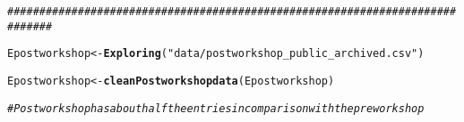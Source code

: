 \documentclass{article}\usepackage[]{graphicx}\usepackage[]{color}
\makeatletter
\newcommand{\hlstr}[1]{\textcolor[rgb]{0.192,0.494,0.8}{#1}}%
\newcommand{\hlcom}[1]{\textcolor[rgb]{0.678,0.584,0.686}{\textit{#1}}}%
\newcommand{\hlstd}[1]{\textcolor[rgb]{0.345,0.345,0.345}{#1}}%
\newcommand{\hlkwb}[1]{\textcolor[rgb]{0.69,0.353,0.396}{#1}}%
\newcommand{\hlkwd}[1]{\textcolor[rgb]{0.737,0.353,0.396}{\textbf{#1}}}%
\newenvironment{kframe}{%
 \def\at@end@of@kframe{}%
 \ifinner\ifhmode%
  \def\at@end@of@kframe{\end{minipage}}%
  \begin{minipage}{\columnwidth}%
 \fi\fi%
 \def\FrameCommand##1{\hskip\@totalleftmargin \hskip-\fboxsep
 \colorbox{shadecolor}{##1}\hskip-\fboxsep
     \hskip-\linewidth \hskip-\@totalleftmargin \hskip\columnwidth}%
 \MakeFramed {\advance\hsize-\width
   \@totalleftmargin\z@ \linewidth\hsize
   \@setminipage}}%
 {\par\unskip\endMakeFramed%
 \at@end@of@kframe}
\newenvironment{knitrout}{}{} %
\makeatother
\begin{document}
\begin{knitrout}
\begin{kframe}
{\ttfamily\noindent\bfseries{}}\begin{alltt}
\hlcom{# ############################################################################}
\end{alltt}
\end{kframe}
\end{knitrout}
\begin{knitrout}
\color{fgcolor}\begin{kframe}
\begin{alltt}
\hlstd{Epostworkshop} \hlkwb{<-} \hlkwd{Exploring}\hlstd{(}\hlstr{"data/postworkshop_public_archived.csv"}\hlstd{)}
\end{alltt}


{\ttfamily\noindent\bfseries{}}\begin{alltt}
\hlstd{Epostworkshop} \hlkwb{<-} \hlkwd{cleanPostworkshopdata}\hlstd{(Epostworkshop)}
\end{alltt}


{\ttfamily\noindent\bfseries{}}\begin{alltt}
\hlcom{# Postworkshop has about half the entries in comparison with the preworkshop }
\end{alltt}
\end{kframe}
\end{knitrout}
\end{document}
